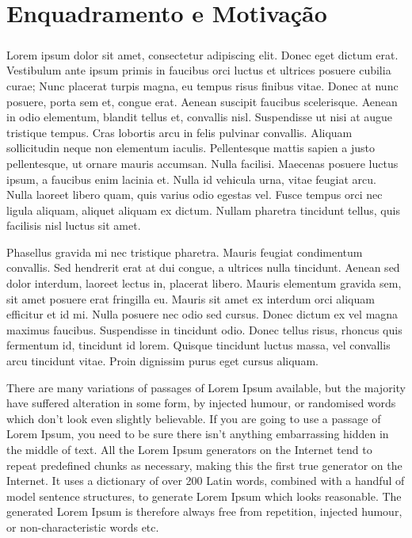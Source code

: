 \chapter*{\thechapter \quad Enquadramento e Motivação}
\paragraph{}
Lorem ipsum dolor sit amet, consectetur adipiscing elit. Donec eget dictum erat. Vestibulum ante ipsum primis in faucibus orci luctus et ultrices posuere cubilia curae; Nunc placerat turpis magna, eu tempus risus finibus vitae. Donec at nunc posuere, porta sem et, congue erat. Aenean suscipit faucibus scelerisque. Aenean in odio elementum, blandit tellus et, convallis nisl. Suspendisse ut nisi at augue tristique tempus. Cras lobortis arcu in felis pulvinar convallis. Aliquam sollicitudin neque non elementum iaculis. Pellentesque mattis sapien a justo pellentesque, ut ornare mauris accumsan. Nulla facilisi. Maecenas posuere luctus ipsum, a faucibus enim lacinia et. Nulla id vehicula urna, vitae feugiat arcu. Nulla laoreet libero quam, quis varius odio egestas vel. Fusce tempus orci nec ligula aliquam, aliquet aliquam ex dictum. Nullam pharetra tincidunt tellus, quis facilisis nisl luctus sit amet.

Phasellus gravida mi nec tristique pharetra. Mauris feugiat condimentum convallis. Sed hendrerit erat at dui congue, a ultrices nulla tincidunt. Aenean sed dolor interdum, laoreet lectus in, placerat libero. Mauris elementum gravida sem, sit amet posuere erat fringilla eu. Mauris sit amet ex interdum orci aliquam efficitur et id mi. Nulla posuere nec odio sed cursus. Donec dictum ex vel magna maximus faucibus. Suspendisse in tincidunt odio. Donec tellus risus, rhoncus quis fermentum id, tincidunt id lorem. Quisque tincidunt luctus massa, vel convallis arcu tincidunt vitae. Proin dignissim purus eget cursus aliquam.

There are many variations of passages of Lorem Ipsum available, but the majority have suffered alteration in some form, by injected humour, or randomised words which don't look even slightly believable. If you are going to use a passage of Lorem Ipsum, you need to be sure there isn't anything embarrassing hidden in the middle of text. All the Lorem Ipsum generators on the Internet tend to repeat predefined chunks as necessary, making this the first true generator on the Internet. It uses a dictionary of over 200 Latin words, combined with a handful of model sentence structures, to generate Lorem Ipsum which looks reasonable. The generated Lorem Ipsum is therefore always free from repetition, injected humour, or non-characteristic words etc.